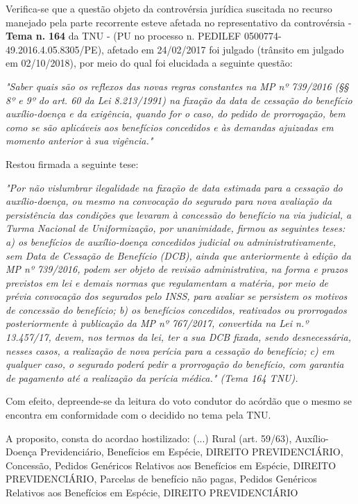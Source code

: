 \documentclass[12pt]{article}
\begin{document}
\justifying
\noindent Verifica-se que a questão objeto da controvérsia jurídica suscitada no recurso manejado pela parte recorrente esteve afetada no representativo da controvérsia - \textbf{Tema n. }\textbf{164} da TNU - (PU no processo n. PEDILEF 0500774-49.2016.4.05.8305/PE),  afetado em 24/02/2017 foi julgado (trânsito em julgado em 02/10/2018), por meio do qual foi elucidada a seguinte questão:

\noindent \textit{"Saber quais são os reflexos das novas regras constantes na MP nº 739/2016 (§§ 8º e 9º do art. 60 da Lei 8.213/1991) na fixação da data de cessação do benefício auxílio-doença e da exigência, quando for o caso, do pedido de prorrogação, bem como se são aplicáveis aos benefícios concedidos e às demandas ajuizadas em momento anterior à sua vigência."}

\noindent Restou firmada a seguinte tese:

\noindent \textit{"Por não vislumbrar ilegalidade na fixação de data estimada para a cessação do auxílio-doença, ou mesmo na convocação do segurado para nova avaliação da persistência das condições que levaram à concessão do benefício na via judicial, a Turma Nacional de Uniformização, por unanimidade, firmou as seguintes teses: a) os benefícios de auxílio-doença concedidos judicial ou administrativamente, sem Data de Cessação de Benefício (DCB), ainda que anteriormente à edição da MP nº 739/2016, podem ser objeto de revisão administrativa, na forma e prazos previstos em lei e demais normas que regulamentam a matéria, por meio de prévia convocação dos segurados pelo INSS, para avaliar se persistem os motivos de concessão do benefício; b) os benefícios concedidos, reativados ou prorrogados posteriormente à publicação da MP nº 767/2017, convertida na Lei n.º 13.457/17, devem, nos termos da lei, ter a sua DCB fixada, sendo desnecessária, nesses casos, a realização de nova perícia para a cessação do benefício; c) em qualquer caso, o segurado poderá pedir a prorrogação do benefício, com garantia de pagamento até a realização da perícia médica." (Tema 164 TNU).}

\noindent Com efeito, depreende-se da leitura do voto condutor do acórdão que o mesmo se encontra em conformidade com o decidido no  tema pela TNU.

\noindent A proposito, consta do acordao hostilizado: (...) Rural (art. 59/63), Auxílio-Doença Previdenciário, Benefícios em Espécie, DIREITO PREVIDENCIÁRIO, Concessão, Pedidos Genéricos Relativos aos Benefícios em Espécie, DIREITO PREVIDENCIÁRIO, Parcelas de benefício não pagas, Pedidos Genéricos Relativos aos Benefícios em Espécie, DIREITO PREVIDENCIÁRIO
\end{document}
